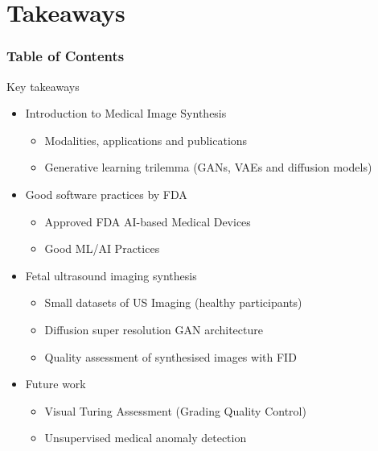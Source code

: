 \section{Takeaways}
\begin{frame}
  \frametitle{Table of Contents}
  \tableofcontents[currentsection]
\end{frame}

{


\begin{frame}{Key takeaways}
\begin{itemize}
\item Introduction to Medical Image Synthesis 
    \begin{itemize}
    \item Modalities, applications and publications
    \item Generative learning trilemma (GANs, VAEs and diffusion models)
    \end{itemize}

\item Good software practices by FDA
    \begin{itemize}
    \item Approved FDA AI-based Medical Devices
    \item Good ML/AI Practices 
    \end{itemize}

\item Fetal ultrasound imaging synthesis 
    \begin{itemize}
    \item Small datasets of US Imaging (healthy participants)
    \item Diffusion super resolution GAN architecture
    \item Quality assessment of synthesised images with FID 
    \end{itemize}

\item Future work
    \begin{itemize}
    \item Visual Turing Assessment (Grading Quality Control)
    \item Unsupervised medical anomaly detection
    \end{itemize}

\end{itemize}

\end{frame}
}



